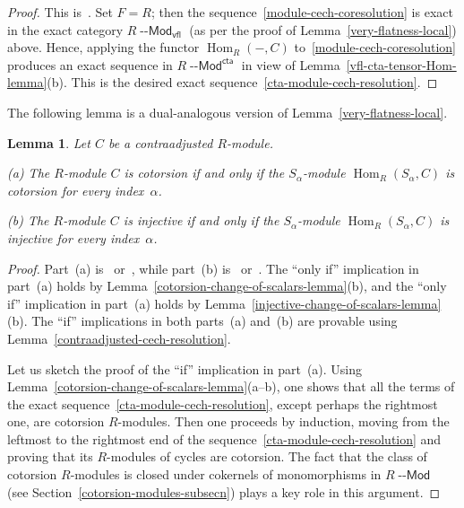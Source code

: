 \documentclass[12pt,a4paper]{amsart}
\newcommand{\+}{\nobreakdash-}
\renewcommand{\:}{\colon}
\DeclareMathOperator{\Hom}{Hom}
\newcommand{\Modl}{{\operatorname{\mathsf{--Mod}}}}
\newcommand{\vfl}{\mathsf{vfl}}
\newcommand{\cta}{\mathsf{cta}}
\theoremstyle{plain}
\newtheorem{lem}[thm]{Lemma}
\theoremstyle{definition}
\begin{document}
\begin{proof}
 This is~\cite[Lemma~1.2.6(b)]{Pcosh}.
 Set $F=R$; then the sequence~\eqref{module-cech-coresolution}
is exact in the exact category $R\Modl_\vfl$ (as per the proof of
Lemma~\ref{very-flatness-local}) above.
 Hence, applying the functor $\Hom_R({-},C)$
to~\eqref{module-cech-coresolution} produces an exact sequence
in $R\Modl^\cta$ in view of Lemma~\ref{vfl-cta-tensor-Hom-lemma}(b).
 This is the desired exact sequence~\eqref{cta-module-cech-resolution}.
\end{proof}

 The following lemma is a dual-analogous version of
Lemma~\ref{very-flatness-local}.

\begin{lem} \label{cotorsion-injective-colocal-if-contraadjusted}
 Let $C$ be a contraadjusted $R$\+module. \par
\textup{(a)} The $R$\+module $C$ is cotorsion if and only if
the $S_\alpha$\+module\/ $\Hom_R(S_\alpha,C)$ is cotorsion
for every index\/~$\alpha$. \par
\textup{(b)} The $R$\+module $C$ is injective if and only if
the $S_\alpha$\+module\/ $\Hom_R(S_\alpha,C)$ is injective
for every index\/~$\alpha$.
\end{lem}

\begin{proof}
 Part~(a) is~\cite[Lemma~1.3.6(a)]{Pcosh} or~\cite[Example~3.8]{Pal},
while part~(b) is~\cite[Lemma~1.3.6(b)]{Pcosh}
or~\cite[Example~3.7]{Pal}.
 The ``only if'' implication in part~(a) holds by
Lemma~\ref{cotorsion-change-of-scalars-lemma}(b),
and the ``only if'' implication in part~(a) holds by
Lemma~\ref{injective-change-of-scalars-lemma}(b).
 The ``if'' implications in both parts~(a) and~(b) are provable
using Lemma~\ref{contraadjusted-cech-resolution}.

 Let us sketch the proof of the ``if'' implication in part~(a).
 Using Lemma~\ref{cotorsion-change-of-scalars-lemma}(a\+-b),
one shows that all the terms of the exact
sequence~\eqref{cta-module-cech-resolution}, except perhaps
the rightmost one, are cotorsion $R$\+modules.
 Then one proceeds by induction, moving from the leftmost to
the rightmost end of the sequence~\eqref{cta-module-cech-resolution}
and proving that its $R$\+modules of cycles are cotorsion.
 The fact that the class of cotorsion $R$\+modules is closed under
cokernels of monomorphisms in $R\Modl$ (see
Section~\ref{cotorsion-modules-subsecn}) plays a key role in
this argument.
\end{proof}
\end{document}
